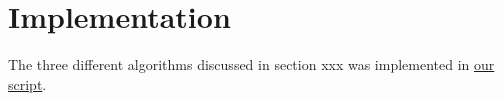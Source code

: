 
\pagebreak
\section{Implementation}

The three different algorithms discussed in section xxx was implemented in \href{}{our script}.
